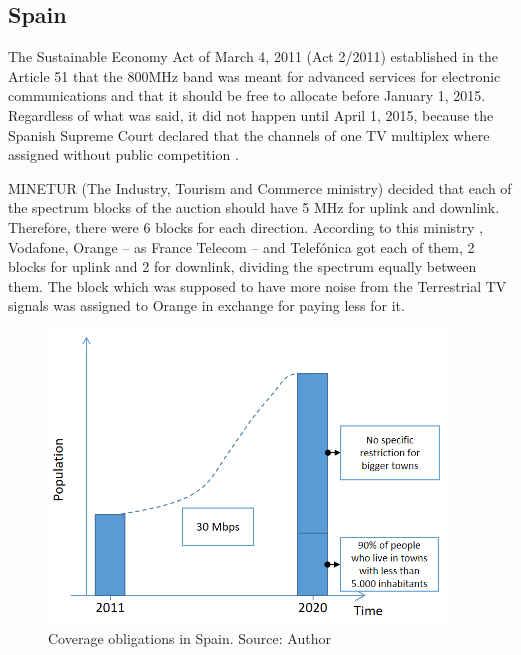 \subsection*{Spain}
The Sustainable Economy Act of March 4, 2011 (Act 2/2011) \cite{2-10} established in the Article 51 that the 800MHz band was meant for advanced services for electronic communications and that it should be free to allocate before January 1, 2015. Regardless of what was said, it did not happen until April 1, 2015, because the Spanish Supreme Court declared that the channels of one TV multiplex where assigned without public competition \cite{2-12}.\par

MINETUR (The Industry, Tourism and Commerce ministry) decided that each of the spectrum blocks of the auction should have 5 MHz for uplink and downlink. Therefore, there were 6 blocks for each direction. According to this ministry \cite{2-11}, Vodafone, Orange – as France Telecom – and Telefónica got each of them, 2 blocks for uplink and 2 for downlink, dividing the spectrum equally between them. The block which was supposed to have more noise from the Terrestrial TV signals was assigned to Orange in exchange for paying less for it.



\begin{figure}[H]
	\begin{Center}
		\includegraphics[width=0.95\textwidth]{./media/image9.png}
		\caption{Coverage obligations in Spain. Source: Author}
	\end{Center}
\end{figure}


